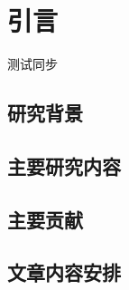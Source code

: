 \chapter{引言}
\label{cha:intro}
测试同步


\section{研究背景}
\label{sec:background}

\section{主要研究内容}
\label{sec:work}

\section{主要贡献}
\label{sec:contribution}

\section{文章内容安排}
\label{sec:contribution}

